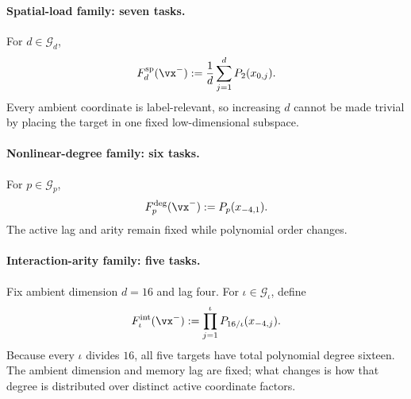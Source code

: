 \paragraph{Spatial-load family: seven tasks.}
For $d\in\mathcal G_d$,
\begin{equation}
    F^{\mathrm{sp}}_d(\vx^-)
      :=\frac1d\sum_{j=1}^dP_2(x_{0,j}).
    \label{eq:atlas-spatial}
\end{equation}
Every ambient coordinate is label-relevant, so increasing $d$ cannot be made
trivial by placing the target in one fixed low-dimensional subspace.

\paragraph{Nonlinear-degree family: six tasks.}
For $p\in\mathcal G_p$,
\begin{equation}
    F^{\mathrm{deg}}_p(\vx^-):=P_p(x_{-4,1}).
    \label{eq:atlas-degree}
\end{equation}
The active lag and arity remain fixed while polynomial order changes.

\paragraph{Interaction-arity family: five tasks.}
Fix ambient dimension $d=16$ and lag four.  For
$\iota\in\mathcal G_\iota$, define
\begin{equation}
    F^{\mathrm{int}}_\iota(\vx^-)
       :=\prod_{j=1}^{\iota}
         P_{16/\iota}(x_{-4,j}).
    \label{eq:atlas-interaction}
\end{equation}
Because every $\iota$ divides $16$, all five targets have total polynomial
degree sixteen.  The ambient dimension and memory lag are fixed; what changes
is how that degree is distributed over distinct active coordinate factors.

